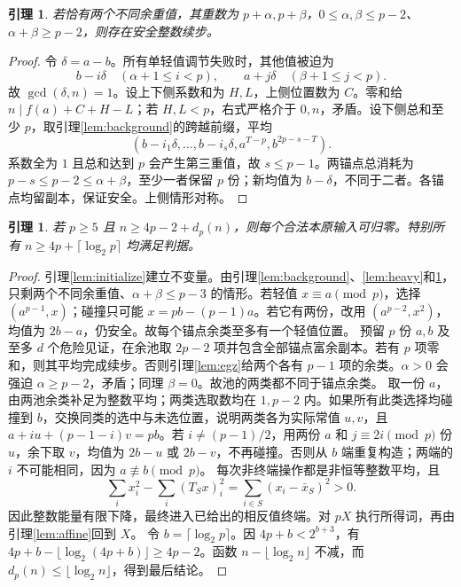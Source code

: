 \documentclass[11pt,a4paper]{article}
\newtheorem{lemma}[theorem]{引理}
\theoremstyle{definition}
\numberwithin{equation}{section}
\begin{document}
\begin{lemma}\label{lem:two-heavy}
若恰有两个不同余重值，其重数为 $p+\alpha,p+\beta$，$0\le\alpha,\beta\le p-2$、$\alpha+\beta\ge p-2$，则存在安全整数续步。
\end{lemma}
\begin{proof}
令 $\delta=a-b$。所有单轻值调节失败时，其他值被迫为
\[
b-i\delta\quad(\alpha+1\le i<p),\qquad
a+j\delta\quad(\beta+1\le j<p).
\]
故 $\gcd(\delta,n)=1$。设上下侧系数和为 $H,L$，上侧位置数为 $C$。零和给 $n\mid f(a)+C+H-L$；若 $H,L<p$，右式严格介于 $0,n$，矛盾。设下侧总和至少 $p$，取引理\ref{lem:background}的跨越前缀，平均
\[(b-i_1\delta,\ldots,b-i_s\delta,a^{T-p},b^{2p-s-T}).
\]
系数全为 $1$ 且总和达到 $p$ 会产生第三重值，故 $s\le p-1$。两锚点总消耗为 $p-s\le p-2\le\alpha+\beta$，至少一者保留 $p$ 份；新均值为 $b-\delta$，不同于二者。各锚点均留副本，保证安全。上侧情形对称。
\end{proof}

\begin{lemma}\label{lem:integer-range}
若 $p\ge5$ 且 $n\ge4p-2+d_p(n)$，则每个合法本原输入可归零。特别所有 $n\ge4p+\lceil\log_2p\rceil$ 均满足判据。
\end{lemma}
\begin{proof}
引理\ref{lem:initialize}建立不变量。由引理\ref{lem:background}、\ref{lem:heavy}和\ref{lem:two-heavy}，只剩两个不同余重值、$\alpha+\beta\le p-3$ 的情形。若轻值 $x\equiv a\pmod p$，选择 $(a^{p-1},x)$；碰撞只可能 $x=pb-(p-1)a$。若它有两份，改用 $(a^{p-2},x^2)$，均值为 $2b-a$，仍安全。故每个锚点余类至多有一个轻值位置。
预留 $p$ 份 $a,b$ 及至多 $d$ 个危险见证，在余池取 $2p-2$ 项并包含全部锚点富余副本。若有 $p$ 项零和，则其平均完成续步。否则引理\ref{lem:egz}给两个各有 $p-1$ 项的余类。$\alpha>0$ 会强迫 $\alpha\ge p-2$，矛盾；同理 $\beta=0$。故池的两类都不同于锚点余类。
取一份 $a$，由两池余类补足为整数平均；两类选取数均在 $1,p-2$ 内。如果所有此类选择均碰撞到 $b$，交换同类的选中与未选位置，说明两类各为实际常值 $u,v$，且 $a+iu+(p-1-i)v=pb$。若 $i\ne(p-1)/2$，用两份 $a$ 和 $j\equiv2i\pmod p$ 份 $u$，余下取 $v$，均值为 $2b-u$ 或 $2b-v$，不再碰撞。否则从 $b$ 端重复构造；两端的 $i$ 不可能相同，因为 $a\not\equiv b\pmod p$。
每次非终端操作都是非恒等整数平均，且
\[\sum_i x_i^2-\sum_i(T_Sx)_i^2=\sum_{i\in S}(x_i-\bar x_S)^2>0.
\]
因此整数能量有限下降，最终进入已给出的相反值终端。对 $pX$ 执行所得词，再由引理\ref{lem:affine}回到 $X$。
令 $b=\lceil\log_2p\rceil$。因 $4p+b<2^{b+3}$，有 $4p+b-\lfloor\log_2(4p+b)\rfloor\ge4p-2$。函数 $n-\lfloor\log_2n\rfloor$ 不减，而 $d_p(n)\le\lfloor\log_2n\rfloor$，得到最后结论。
\end{proof}
\end{document}
